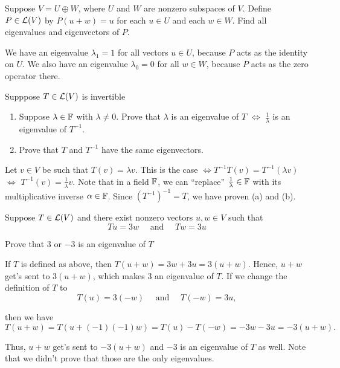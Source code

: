 \begin{xrcs}
  Suppose $V = U \oplus W$, where $U$ and $W$ are nonzero subspaces of $V$. Define $P \in \mathcal{L}(V)$ by $P(u+w) = u$ for each $u \in U$ and each $w \in W$. Find all eigenvalues and eigenvectors of $P$.
  \begin{xsol}
    We have an eigenvalue $\lambda_1 = 1$ for all vectors $u \in U$, because $P$ acts as the identity on $U$. We also have an eigenvalue $\lambda_0 = 0$ for all $w \in W$, because $P$ acts as the zero operator there.
  \end{xsol}
\end{xrcs}

\begin{xrcs}
  Supppose $T \in \mathcal{L}(V)$ is invertible
  \begin{enumerate}
    \item Suppose $\lambda \in \mathbb{F}$ with $\lambda \neq 0$. Prove that $\lambda$ is an eigenvalue of $T$ $\iff$ $\frac{1}{\lambda}$ is an eigenvalue of $T^{-1}$.
    \item Prove that $T$ and $T^{-1}$ have the same eigenvectors.
  \end{enumerate}
  \begin{xsol}
    Let $v \in V$ be such that $T(v) = \lambda v$. This is the case $\iff T^{-1} T(v) = T^{-1} (\lambda v)$ $\iff$ $T^{-1} (v) = \frac{1}{\lambda} v$. Note that in a field $\mathbb{F}$, we can ``replace'' $\frac{1}{\lambda}\in \mathbb{F}$ with its multiplicative inverse $\alpha \in \mathbb{F}$. Since $\left(T^{-1}\right)^{-1} = T$, we have proven (a) and (b).
  \end{xsol}
\end{xrcs}

\begin{xrcs}
  Suppose $T \in \mathcal{L}(V)$ and there exist nonzero vectors $u, w \in V$ such that
  \begin{equation}
    Tu = 3w \quad \text{ and } \quad Tw = 3u
  \end{equation}

  Prove that $3$ or $-3$ is an eigenvalue of $T$
  \begin{xsol}
    If $T$ is defined as above, then $T(u+w) = 3w + 3u = 3(u+w)$. Hence, $u+w$ get's sent to $3(u+w)$, which makes $3$ an eigenvalue of $T$. If we change the definition of $T$ to
    \begin{equation}
      T(u) = 3(-w) \quad \text{ and } \quad T(-w) = 3u,
    \end{equation}

    then we have
    \begin{equation}
      T(u+w) = T(u + (-1)(-1)w) = T(u) - T(-w) = -3w -3u = -3 (u+w).
    \end{equation}

    Thus, $u+w$ get's sent to $-3 (u+w)$ and $-3$ is an eigenvalue of $T$ as well. Note that we didn't prove that those are the only eigenvalues.
  \end{xsol}
\end{xrcs}

